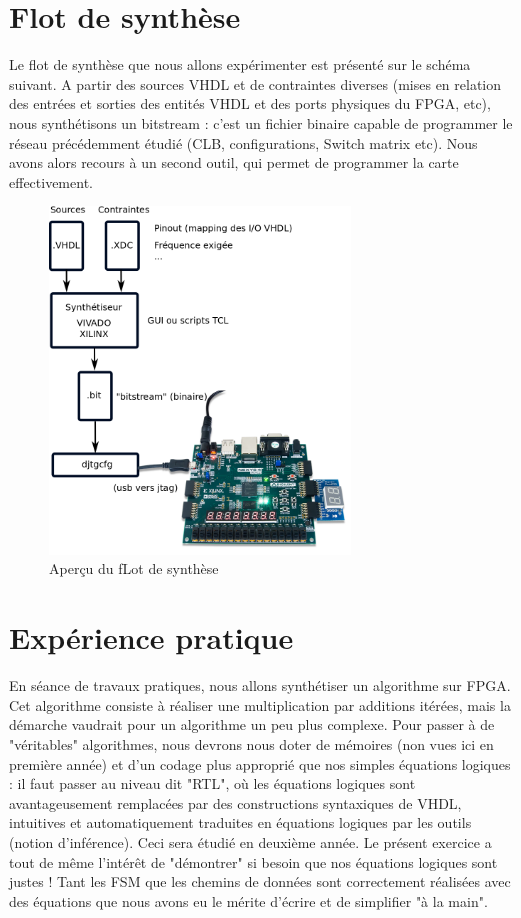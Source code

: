 \section{Flot de synthèse}

Le flot de synthèse que nous allons expérimenter est présenté sur le schéma suivant. A partir des sources VHDL et de contraintes diverses (mises en relation des entrées et sorties
des entités VHDL et des ports physiques du FPGA, etc), nous synthétisons un bitstream : c'est un fichier binaire capable de programmer le réseau précédemment étudié (CLB, configurations, Switch matrix etc).
Nous avons alors recours à un second outil, qui permet de programmer la carte effectivement.

\begin{figure}[h!]
  \centering
  \includegraphics[width=8cm]{./figures/synthesis_flow.png}
  \caption{Aperçu du fLot de synthèse }
  \label{fig:flot_synthese}
\end{figure}

\section{Expérience pratique}
En séance de travaux pratiques, nous allons synthétiser un algorithme sur FPGA. Cet algorithme consiste à réaliser une multiplication par additions itérées, mais la démarche vaudrait pour un algorithme un peu
plus complexe. Pour passer à de "véritables" algorithmes, nous devrons nous doter de mémoires (non vues ici en première année) et d'un codage plus approprié que nos simples équations logiques : il faut passer
au niveau dit "RTL", où les équations logiques sont avantageusement remplacées par des constructions syntaxiques de VHDL, intuitives et automatiquement traduites en équations logiques par les outils (notion d'inférence).
Ceci sera étudié en deuxième année. Le présent exercice a tout de même l'intérêt de "démontrer" si besoin que nos équations logiques sont justes ! Tant les FSM que les chemins de données sont correctement réalisées avec des équations que nous
avons eu le mérite d'écrire et de simplifier "à la main".\\

